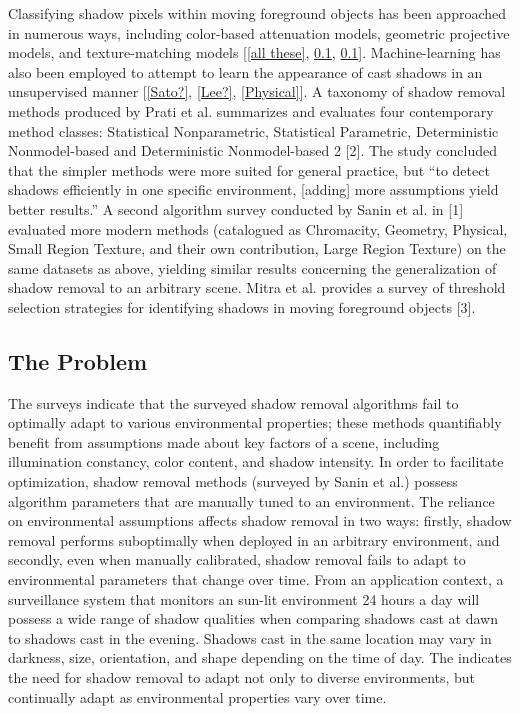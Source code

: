 \documentclass[12pt]{report}
\begin{document}
Classifying shadow pixels within moving foreground objects has been approached in numerous ways, including color-based attenuation models, geometric projective models, and texture-matching models [\ref{all these}, \ref{}, \ref{}]. Machine-learning has also been employed to attempt to learn the appearance of cast shadows in an unsupervised manner [\ref{Sato?}, \ref{Lee?}, \ref{Physical}]. A taxonomy of shadow removal methods produced by Prati et al. summarizes and evaluates four contemporary method classes: Statistical Nonparametric, Statistical Parametric, Deterministic Nonmodel-based and Deterministic Nonmodel-based 2 [2]. The study concluded that the simpler methods were more suited for general practice, but ``to detect shadows efficiently in one specific environment, [adding] more assumptions yield better results.'' A second algorithm survey conducted by Sanin et al. in [1] evaluated more modern methods (catalogued as Chromacity, Geometry, Physical, Small Region Texture, and their own contribution, Large Region Texture) on the same datasets as above, yielding similar results concerning the generalization of shadow removal to an arbitrary scene. Mitra et al. provides a survey of threshold selection strategies for identifying shadows in moving foreground objects [3].

\subsection{The Problem}

The surveys indicate that the surveyed shadow removal algorithms fail to optimally adapt to various environmental properties; these methods quantifiably benefit from assumptions made about key factors of a scene, including illumination constancy, color content, and shadow intensity. In order to facilitate optimization, shadow removal methods (surveyed by Sanin et al.) possess algorithm parameters that are manually tuned to an environment. The reliance on environmental assumptions affects shadow removal in two ways: firstly, shadow removal performs suboptimally when deployed in an arbitrary environment, and secondly, even when manually calibrated, shadow removal fails to adapt to environmental parameters that change over time. From an application context, a surveillance system that monitors an sun-lit environment 24 hours a day will possess a wide range of shadow qualities when comparing shadows cast at dawn to shadows cast in the evening. Shadows cast in the same location may vary in darkness, size, orientation, and shape depending on the time of day. The indicates the need for shadow removal to adapt not only to diverse environments, but continually adapt as environmental properties vary over time.
\end{document}
